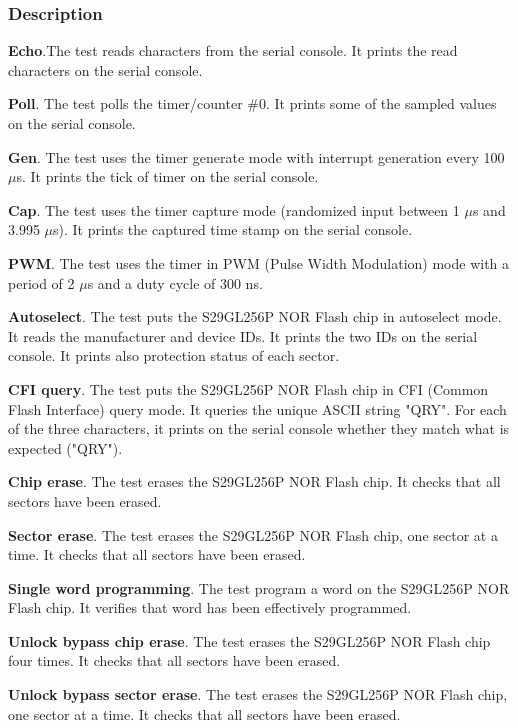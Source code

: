 \subsubsection{Description}

\noindent \textbf{Echo}.The test reads characters from the serial console.
It prints the read characters on the serial console.

\noindent \textbf{Poll}. The test polls the timer/counter \#0.
It prints some of the sampled values on the serial console.

\noindent \textbf{Gen}. The test uses the timer generate mode with interrupt generation every 100 $\mu$s.
It prints the tick of timer on the serial console.

\noindent \textbf{Cap}. The test uses the timer capture mode (randomized input between 1 $\mu$s and 3.995 $\mu$s).
It prints the captured time stamp on the serial console.

\noindent \textbf{PWM}. The test uses the timer in PWM (Pulse Width Modulation) mode with a period of 2 $\mu$s and a duty cycle of 300 ns.

\noindent \textbf{Autoselect}. The test puts the S29GL256P NOR Flash chip in autoselect mode.
It reads the manufacturer and device IDs.
It prints the two IDs on the serial console.
It prints also protection status of each sector.

\noindent \textbf{CFI query}. The test puts the S29GL256P NOR Flash chip in CFI (Common Flash Interface) query mode.
It queries the unique ASCII string "QRY".
For each of the three characters, it prints on the serial console whether they match what is expected ("QRY").

\noindent \textbf{Chip erase}. The test erases the S29GL256P NOR Flash chip.
It checks that all sectors have been erased.

\noindent \textbf{Sector erase}. The test erases the S29GL256P NOR Flash chip, one sector at a time.
It checks that all sectors have been erased.

\noindent \textbf{Single word programming}. The test program a word on the S29GL256P NOR Flash chip.
It verifies that word has been effectively programmed.

\noindent \textbf{Unlock bypass chip erase}. The test erases the S29GL256P NOR Flash chip four times.
It checks that all sectors have been erased.

\noindent \textbf{Unlock bypass sector erase}. The test erases the S29GL256P NOR Flash chip, one sector at a time.
It checks that all sectors have been erased.

